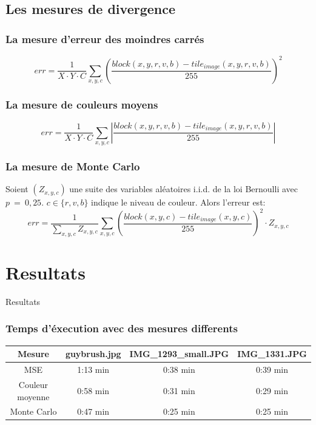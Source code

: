 \documentclass[handout]{beamer}
\begin{document}
\subsection{Les mesures de divergence}

\begin{frame}
\frametitle{\bf La mesure d'erreur des moindres carr\'es}
\begin{equation*}
err=\frac{1}{X\cdot Y\cdot C}\sum_{x,y,c}\left(\frac{block(x,y,r,v,b)-tile_{image}(x,y,r,v,b)}{255}\right)^2
\end{equation*}
\end{frame}

\begin{frame}
\frametitle{\bf La mesure de couleurs moyens}
\begin{equation*}
err=\frac{1}{X\cdot Y\cdot C}\sum_{x,y,c}\left|\frac{block(x,y,r,v,b)-tile_{image}(x,y,r,v,b)}{255}\right|
\end{equation*}
\end{frame}
\begin{frame}
\frametitle{\bf La mesure de Monte Carlo}
Soient $(Z_{x,y,c})$ une suite des variables al\'eatoires i.i.d. de la loi Bernoulli avec $p~=~0,25$.
$c\in \{r,v,b\}$ indique le niveau de couleur.
Alors l'erreur est:
\begin{equation*}
err=\frac{1}{\sum_{x,y,c}Z_{x,y,c}}\sum_{x,y,c}\left(\frac{block(x,y,c)-tile_{image}(x,y,c)}{255}\right)^2\cdot Z_{x,y,c}
\end{equation*}
\end{frame}
\section{Resultats}

\begin{frame}
\begin{center}
{\Huge Resultats}
\end{center}
\end{frame}


\begin{frame}
\frametitle{\bf Temps d'\'execution avec des mesures differents}
\begin{table}
\begin{tabular}{|c|c|c|c|}
\hline 
\small Mesure & \small guybrush.jpg & \small IMG\_1293\_small.JPG & \small IMG\_1331.JPG \\ 
\hline 
\small MSE & 1:13 min & 0:38 min & 0:39 min \\ 
\hline 
\small Couleur moyenne & 0:58 min & 0:31 min & 0:29 min \\ 
\hline 
\small Monte Carlo & 0:47 min & 0:25 min & 0:25 min \\ 
\hline 

\end{tabular}
\label{tab:temps}  
\end{table}
\end{frame}
\end{document}
